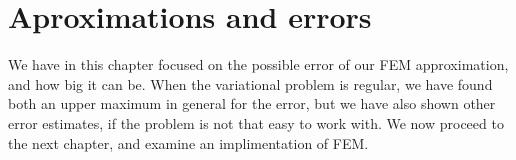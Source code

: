 \chapter{Aproximations and errors}









We have in this chapter focused on the possible error of our FEM approximation, 
and how big it can be. 
When the variational problem is regular, we have found both an upper maximum 
in general for the error, but we have also shown other error estimates, 
if the problem is not that easy to work with.
We now proceed to the next chapter, and examine an implimentation of 
FEM.